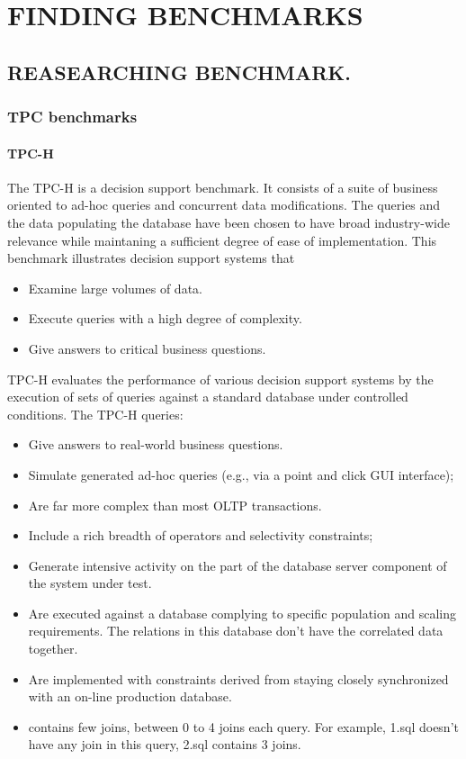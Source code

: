 
\chapter{FINDING BENCHMARKS}\label{chapter:Finding benchmarks}

\section{REASEARCHING BENCHMARK.}
\subsection{TPC benchmarks}
\subsubsection{TPC-H}
{\justify
The TPC-H \cite{TPC} is a decision support benchmark. It consists of a suite of business oriented to ad-hoc queries and concurrent data modifications. The queries and the data populating the database have been chosen to have broad industry-wide relevance while maintaning a sufficient degree of ease of implementation. This benchmark illustrates decision support systems that
\begin{itemize}
\item Examine large volumes of data.
\item Execute queries with a high degree of complexity.
\item Give answers to critical business questions.
\end{itemize}
\par }
{\justify
TPC-H evaluates the performance of various decision support systems by the execution of sets of queries against a standard database under controlled conditions. The TPC-H queries:
\begin{itemize}
\item Give answers to real-world business questions.
\item Simulate generated ad-hoc queries (e.g., via a point and click GUI interface);
\item Are far more complex than most OLTP transactions.
\item Include a rich breadth of operators and selectivity constraints;
\item Generate intensive activity on the part of the database server component of the system under test.
\item Are executed against a database complying to specific population and scaling requirements. The relations in this database don't have the correlated data together.
\item Are implemented with constraints derived from staying closely synchronized with an on-line production database. 
\item contains few joins, between 0 to 4 joins each query. For example, 1.sql doesn't have any join in this query, 2.sql contains 3 joins.
\end{itemize}
\par }
\vspace{0.5cm}
